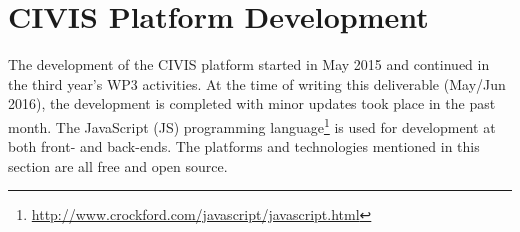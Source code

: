 \section{CIVIS Platform  Development} 
 
The development of the CIVIS platform started in May 2015 \citep{Huang2015c} and continued in the third year's WP3 activities. At the time of writing this deliverable (May/Jun 2016), the development is completed with minor updates took place in the past month.
% 
The JavaScript (JS) programming language\footnote{\url{http://www.crockford.com/javascript/javascript.html}} is used for development at both front- and back-ends. 
The platforms and technologies mentioned in this section are all free and open source. 




